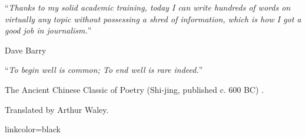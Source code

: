 \documentclass[
11pt, %
english, %
singlespacing, %
toctotoc, %
headsepline, %
]{MastersDoctoralThesis} %
\begin{document}
\noindent\enquote{\itshape Thanks to my solid academic training, today I can write hundreds of words on virtually any topic without possessing a shred of information, which is how I got a good job in journalism.}\bigbreak

\hfill Dave Barry

\noindent\enquote{\itshape To begin well is common; To end well is rare indeed.}\bigbreak

\hfill The Ancient Chinese Classic of Poetry (Shi-jing, published c. 600 BC) \cite{ChineseIdioms}.

\hfill Translated by Arthur Waley.





{\hypersetup
    {linkcolor=black} %
    \tableofcontents %
}







\mainmatter %
\pagestyle{thesis} %
\end{document}
